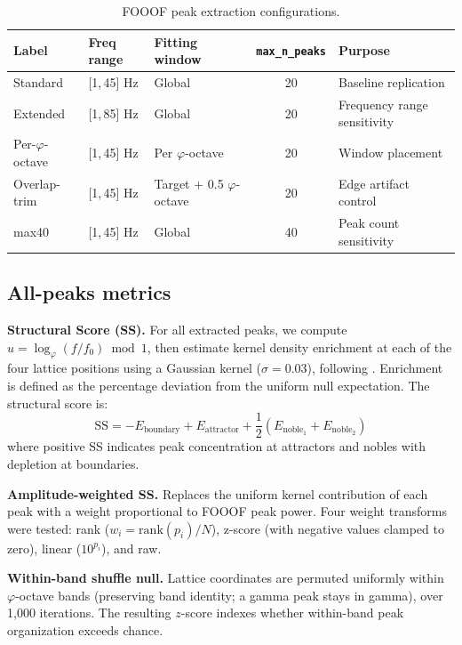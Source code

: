 \documentclass[11pt,a4paper]{article}
\newcommand{\phisym}{\varphi}
\newcommand{\fzero}{f_0}
\begin{document}
\begin{table}[H]
\centering
\caption{FOOOF peak extraction configurations.}
\label{tab:extraction}
\begin{tabular}{lllcl}
\toprule
Label & Freq range & Fitting window & \texttt{max\_n\_peaks} & Purpose \\
\midrule
Standard & [1,\,45] Hz & Global & 20 & Baseline replication \\
Extended & [1,\,85] Hz & Global & 20 & Frequency range sensitivity \\
Per-$\phisym$-octave & [1,\,45] Hz & Per $\phisym$-octave & 20 & Window placement \\
Overlap-trim & [1,\,45] Hz & Target $+$ 0.5 $\phisym$-octave & 20 & Edge artifact control \\
max40 & [1,\,45] Hz & Global & 40 & Peak count sensitivity \\
\bottomrule
\end{tabular}
\end{table}

\subsection{All-peaks metrics}

\textbf{Structural Score (SS).} For all extracted peaks, we compute $u = \log_\phisym(f/\fzero) \bmod 1$, then estimate kernel density enrichment at each of the four lattice positions using a Gaussian kernel ($\sigma = 0.03$), following \textcite{Lacy2026paper1}. Enrichment is defined as the percentage deviation from the uniform null expectation. The structural score is:
\begin{equation}
\text{SS} = -E_{\text{boundary}} + E_{\text{attractor}} + \frac{1}{2}(E_{\text{noble}_1} + E_{\text{noble}_2})
\end{equation}
where positive SS indicates peak concentration at attractors and nobles with depletion at boundaries.

\textbf{Amplitude-weighted SS.} Replaces the uniform kernel contribution of each peak with a weight proportional to FOOOF peak power. Four weight transforms were tested: rank ($w_i = \text{rank}(p_i)/N$), z-score (with negative values clamped to zero), linear ($10^{p_i}$), and raw.

\textbf{Within-band shuffle null.} Lattice coordinates are permuted uniformly within $\phisym$-octave bands (preserving band identity; a gamma peak stays in gamma), over 1{,}000 iterations. The resulting $z$-score indexes whether within-band peak organization exceeds chance.
\end{document}
